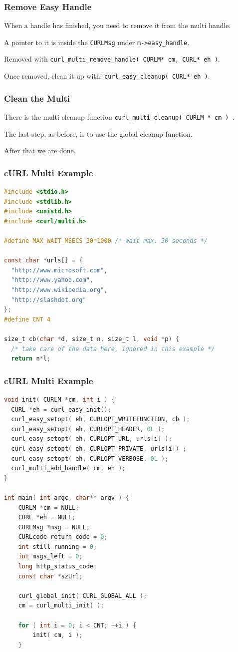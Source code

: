 \begin{frame}
	\frametitle{Remove Easy Handle}

	When a handle has finished, you need to remove it from the multi handle.

	A pointer to it is inside the \texttt{CURLMsg} under \texttt{m->easy\_handle}.

	Removed with \texttt{curl\_multi\_remove\_handle( CURLM* cm, CURL* eh )}.

	Once removed, clean it up with: \texttt{curl\_easy\_cleanup( CURL* eh )}.


\end{frame}

\begin{frame}
	\frametitle{Clean the Multi}

	There is the multi cleanup function \texttt{curl\_multi\_cleanup( CURLM * cm ) }.

	The last step, as before, is to use the global cleanup function.

	After that we are done.


\end{frame}

\begin{frame}[fragile]
	\frametitle{cURL Multi Example}

	\begin{lstlisting}[language=C]
#include <stdio.h>
#include <stdlib.h>
#include <unistd.h>
#include <curl/multi.h>

#define MAX_WAIT_MSECS 30*1000 /* Wait max. 30 seconds */

const char *urls[] = {
  "http://www.microsoft.com",
  "http://www.yahoo.com",
  "http://www.wikipedia.org",
  "http://slashdot.org"
};
#define CNT 4

size_t cb(char *d, size_t n, size_t l, void *p) {
  /* take care of the data here, ignored in this example */
  return n*l;
\end{lstlisting}

\end{frame}

\begin{frame}[fragile]
	\frametitle{cURL Multi Example}

	\begin{lstlisting}[language=C]
void init( CURLM *cm, int i ) {
  CURL *eh = curl_easy_init();
  curl_easy_setopt( eh, CURLOPT_WRITEFUNCTION, cb );
  curl_easy_setopt( eh, CURLOPT_HEADER, 0L );
  curl_easy_setopt( eh, CURLOPT_URL, urls[i] );
  curl_easy_setopt( eh, CURLOPT_PRIVATE, urls[i]) ;
  curl_easy_setopt( eh, CURLOPT_VERBOSE, 0L );
  curl_multi_add_handle( cm, eh );
}

int main( int argc, char** argv ) {
    CURLM *cm = NULL;
    CURL *eh = NULL;
    CURLMsg *msg = NULL;
    CURLcode return_code = 0;
    int still_running = 0; 
    int msgs_left = 0;
    long http_status_code;
    const char *szUrl;

    curl_global_init( CURL_GLOBAL_ALL );
    cm = curl_multi_init( );
    
    for ( int i = 0; i < CNT; ++i ) {
        init( cm, i );
    }
\end{lstlisting}

\end{frame}

